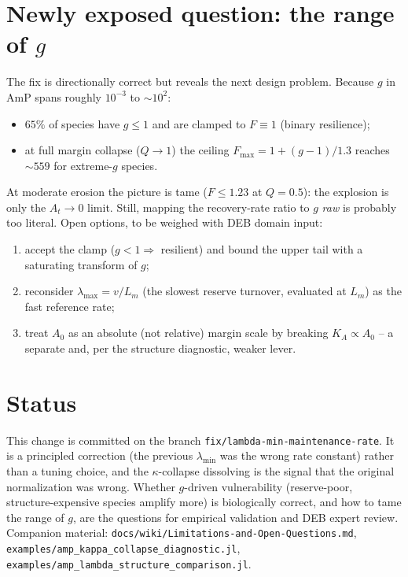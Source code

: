\documentclass[11pt]{article}
\begin{document}
\section{Newly exposed question: the range of $g$}
The fix is directionally correct but reveals the next design problem. Because $g$ in
AmP spans roughly $10^{-3}$ to $\sim\!10^{2}$:
\begin{itemize}[nosep]
  \item $65\%$ of species have $g\le1$ and are clamped to $F\equiv1$ (binary resilience);
  \item at full margin collapse ($Q\to1$) the ceiling $F_{\max}=1+(g-1)/1.3$ reaches
        $\sim\!559$ for extreme-$g$ species.
\end{itemize}
At moderate erosion the picture is tame ($F\le1.23$ at $Q=0.5$): the explosion is only
the $A_t\to0$ limit. Still, mapping the recovery-rate ratio to $g$ \emph{raw} is
probably too literal. Open options, to be weighed with DEB domain input:
\begin{enumerate}[nosep]
  \item accept the clamp ($g<1\Rightarrow$ resilient) and bound the upper tail with a
        saturating transform of $g$;
  \item reconsider $\lambda_{\max}=v/L_m$ (the slowest reserve turnover, evaluated at
        $L_m$) as the fast reference rate;
  \item treat $A_0$ as an absolute (not relative) margin scale by breaking
        $K_A\propto A_0$ -- a separate and, per the structure diagnostic, weaker lever.
\end{enumerate}

\section{Status}
This change is committed on the branch
\texttt{fix/lambda-min-maintenance-rate}. It is a principled correction (the previous
$\lambda_{\min}$ was the wrong rate constant) rather than a tuning choice, and the
$\kappa$-collapse dissolving is the signal that the original normalization was wrong.
Whether $g$-driven vulnerability (reserve-poor, structure-expensive species amplify
more) is biologically correct, and how to tame the range of $g$, are the questions for
empirical validation and DEB expert review. Companion material:
\texttt{docs/wiki/Limitations-and-Open-Questions.md},
\texttt{examples/amp\_kappa\_collapse\_diagnostic.jl},
\texttt{examples/amp\_lambda\_structure\_comparison.jl}.
\end{document}
